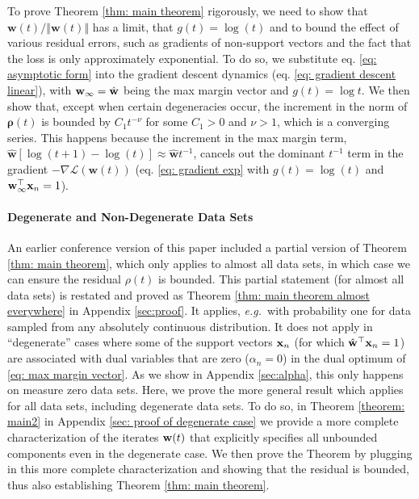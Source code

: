 \documentclass[twoside,11pt,english]{article}
\begin{document}
To prove Theorem \ref{thm: main theorem} rigorously, we need to show
that $\mathbf{w}\left(t\right)/\left\Vert \mathbf{w}\left(t\right)\right\Vert $
has a limit, that $g\left(t\right)=\log\left(t\right)$ and to bound
the effect of various residual errors, such as gradients of non-support
vectors and the fact that the loss is only approximately exponential.
To do so, we substitute eq. \ref{eq: asymptotic form} into the gradient
descent dynamics (eq. \ref{eq: gradient descent linear}), with $\mathbf{w}_{\infty}=\hat{\mathbf{w}}$
being the max margin vector and $g(t)=\log t$. We then show that, except when certain degeneracies occur, 
the increment in the norm of $\boldsymbol{\rho}\left(t\right)$ is
bounded by $C_{1}t^{-\nu}$ for some $C_{1}>0$ and $\nu>1$, which
is a converging series. This happens because the increment in the
max margin term, $\hat{\mathbf{w}}\left[\log\left(t+1\right)-\log\left(t\right)\right]\approx\hat{\mathbf{w}}t^{-1}$,
cancels out the dominant $t^{-1}$ term in the gradient $-\nabla\mathcal{L}\left(\mathbf{w}\left(t\right)\right)$
(eq. \ref{eq: gradient exp} with $g\left(t\right)=\log\left(t\right)$
and $\mathbf{w}_{\infty}^{\top}\mathbf{x}_{n}=1$).



\paragraph{Degenerate and Non-Degenerate Data Sets}  An earlier conference version of this paper \citep{Soudry2017a} included a partial version of Theorem \ref{thm: main theorem}, which only applies to almost all data sets, in which case we can ensure the residual $\rho(t)$ is bounded.  This partial statement (for almost all data sets) is restated and proved as Theorem \ref{thm: main theorem almost everywhere} in Appendix \ref{sec:proof}.  It applies, \emph{e.g.}~with probability one for data sampled from any absolutely continuous distribution.  It does not apply  in ``degenerate'' cases where some of the support vectors $\mathbf{x}_n$ (for which $\hat{\mathbf{w}}^\top \mathbf{x}_n=1$) are associated with dual variables that are zero ($\alpha_n=0$) in the dual optimum of \ref{eq: max margin vector}.  As we show in Appendix \ref{sec:alpha}, this only happens on measure zero data sets.  Here, we prove the more general result which applies for all data sets, including degenerate data sets.  To do so, in Theorem \ref{theorem: main2} in Appendix \ref{sec: proof of degenerate case} we provide a more complete characterization of the iterates $\mathbf{w}(t)$ that explicitly specifies all unbounded components even in the degenerate case.  We then prove the Theorem by plugging in this more complete characterization and showing that the residual is bounded, thus also establishing Theorem \ref{thm: main theorem}.
\end{document}
